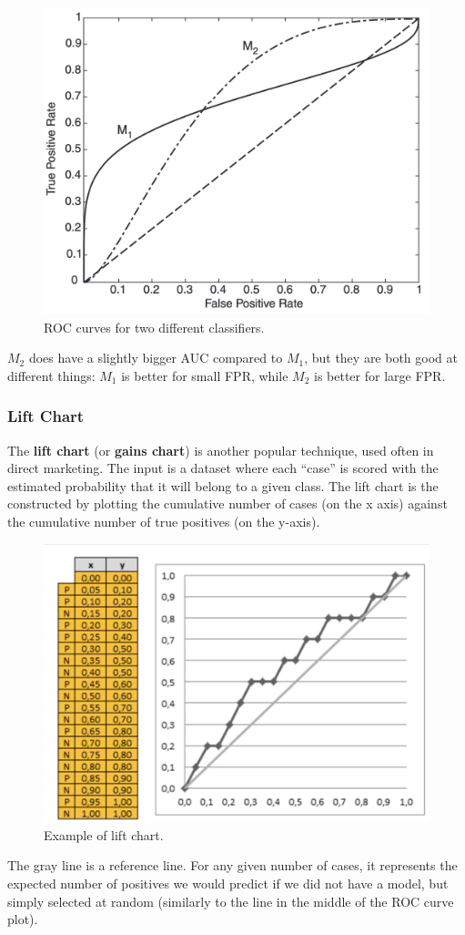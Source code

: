 \begin{figure}[h]
    \centering
    \includegraphics[width=0.5\linewidth]{img/ROC_comparison.png}
    \caption{ROC curves for two different classifiers.}
\end{figure}

$M_2$ does have a slightly bigger AUC compared to $M_1$, but they are both good at different things: $M_1$ is better for small FPR, while $M_2$ is better for large FPR.

\subsubsection{Lift Chart}

The \textbf{lift chart} (or \textbf{gains chart}) is another popular technique, used often in direct marketing. The input is a dataset where each ``case'' is scored with the estimated probability that it will belong to a given class. The lift chart is the constructed by plotting the cumulative number of cases (on the x axis) against the cumulative number of true positives (on the y-axis). 

\begin{figure}[h]
    \centering
    \includegraphics[width=0.5\linewidth]{img/Lift chart.png}
    \caption{Example of lift chart.}
\end{figure}

The gray line is a reference line. For any given number of cases, it represents the expected number of positives we would predict if we did not have a model, but simply selected at random (similarly to the line in the middle of the ROC curve plot).

